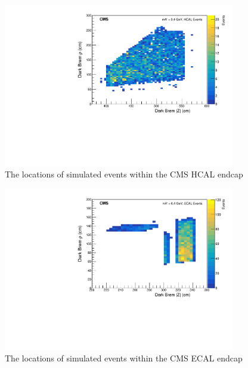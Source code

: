\begin{figure}[ht]
	\includegraphics[width=0.9\textwidth]{figures/HCALbrems.pdf}
	\centering
	\caption{The locations of simulated \dbrem events within the CMS HCAL endcap}
	\label{fig:HEbrems}
\end{figure}

\begin{figure}[ht]
	\includegraphics[width=0.9\textwidth]{figures/ECALbrems.pdf}
	\centering
	\caption{The locations of simulated \dbrem events within the CMS ECAL endcap}
	\label{fig:EEbrems}
\end{figure}

